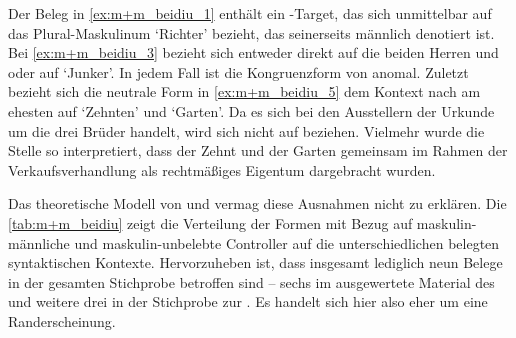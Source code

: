 Der Beleg in \cref{ex:m+m_beidiu_1} enthält ein -Target, das sich
unmittelbar auf das Plural-Maskulinum  `Richter' bezieht, das
seinerseits männlich denotiert ist.
Bei \cref{ex:m+m_beidiu_3} bezieht sich  entweder direkt auf die
beiden Herren  und 
oder auf  `Junker'. In jedem Fall ist die Kongruenzform
von  anomal. Zuletzt bezieht sich die neutrale Form  in
\cref{ex:m+m_beidiu_5} dem Kontext nach am ehesten auf
 `Zehnten' und  `Garten'. Da es sich bei
den Ausstellern der Urkunde um die drei Brüder  \autocite[\pno~1201~AB,
472.6--7]{cao2} handelt, wird sich  nicht auf  beziehen.
Vielmehr wurde die Stelle so interpretiert, dass der Zehnt und der Garten
gemeinsam im Rahmen der Verkaufsverhandlung als rechtmäßiges Eigentum
dargebracht wurden.

Das theoretische Modell von \citet{wechsler2009} und \citet{wechslerzlatic2003}
vermag diese Ausnahmen nicht zu erklären. Die \cref{tab:m+m_beidiu} zeigt die
Verteilung der Formen mit Bezug auf maskulin-männliche und maskulin-unbelebte
Controller auf die unterschiedlichen belegten syntaktischen Kontexte.
Hervorzuheben ist, dass insgesamt lediglich neun Belege in der gesamten
Stichprobe betroffen sind -- sechs im ausgewertete Material des \CAO{}
und weitere drei in der Stichprobe zur \KC{}. Es handelt sich hier
also eher um eine Randerscheinung.

